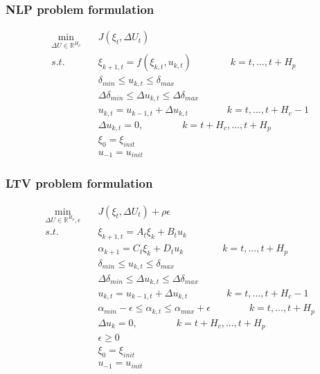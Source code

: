 \documentclass{beamer}
\begin{document}
\begin{frame}
\frametitle{NLP problem formulation}

\begin{align*}
\min_{\Delta U \in \mathbb{R}^{H_p}} \quad &J(\xi_t, \Delta U_t) \\
s.t. \qquad &\xi_{k+1,t} = f(\xi_{k,t}, u_{k,t}) \qquad \qquad k = t, . . . , t
+ H_{p}
\\
&\delta_{min} \leq u_{k,t} \leq \delta_{max} \\
&\Delta \delta_{min} \leq \Delta u_{k,t} \leq \Delta \delta_{max} \\
&u_{k,t} = u_{k-1,t} + \Delta {u_{k,t}} \qquad \qquad k = t, . . . , t + H_c
-1 \\
&\Delta u_{k,t} = 0, \qquad \qquad k = t + H_c, . . . , t + H_p \\
&\xi_0 = \xi_{init} \\
& u_{-1} = u_{init}
\end{align*}

\end{frame}







\begin{frame}
\frametitle{LTV problem formulation }

\begin{align*}
\min_{\Delta U \in \mathbb{R}^{H_p}, \epsilon} \quad &J(\xi_t, \Delta U_t) +
\rho \epsilon \\
s.t. \qquad &\xi_{k+1,t} = A_t \xi_k + B_t u_k \\
&\alpha_{k+1} = C_t \xi_k + D_t u_k \qquad \qquad k = t, . . . , t + H_p \\
&\delta_{min} \leq u_{k,t} \leq \delta_{max} \\ 
&\Delta \delta_{min} \leq \Delta u_{k,t} \leq \Delta \delta_{max} \\
&u_{k,t} = u_{k-1,t} + \Delta u_{k,t} \qquad \qquad k = t, . . ., t + H_c - 1 \\
&\alpha_{min} - \epsilon \leq \alpha_{k,t} \leq \alpha_{max} + \epsilon \qquad
\qquad k = t, . . ., t + H_p\\
&\Delta u_k = 0, \qquad \qquad k = t + H_c, . . . , t + H_p \\
&\epsilon \geq 0 \\
&\xi_0 = \xi_{init} \\
& u_{-1} = u_{init}
\end{align*}

\end{frame}
\end{document}
